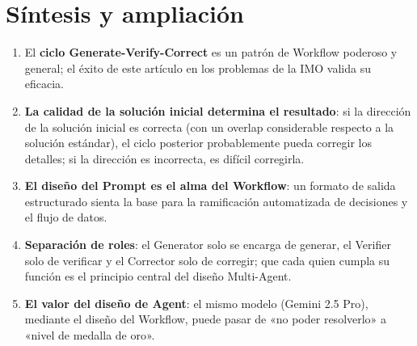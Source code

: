 \section{Síntesis y ampliación}

\begin{enumerate}
    \item El \textbf{ciclo Generate-Verify-Correct} es un patrón de Workflow poderoso y general; el éxito de este artículo en los problemas de la IMO valida su eficacia.
    \item \textbf{La calidad de la solución inicial determina el resultado}: si la dirección de la solución inicial es correcta (con un overlap considerable respecto a la solución estándar), el ciclo posterior probablemente pueda corregir los detalles; si la dirección es incorrecta, es difícil corregirla.
    \item \textbf{El diseño del Prompt es el alma del Workflow}: un formato de salida estructurado sienta la base para la ramificación automatizada de decisiones y el flujo de datos.
    \item \textbf{Separación de roles}: el Generator solo se encarga de generar, el Verifier solo de verificar y el Corrector solo de corregir; que cada quien cumpla su función es el principio central del diseño Multi-Agent.
    \item \textbf{El valor del diseño de Agent}: el mismo modelo (Gemini 2.5 Pro), mediante el diseño del Workflow, puede pasar de «no poder resolverlo» a «nivel de medalla de oro».
\end{enumerate}


